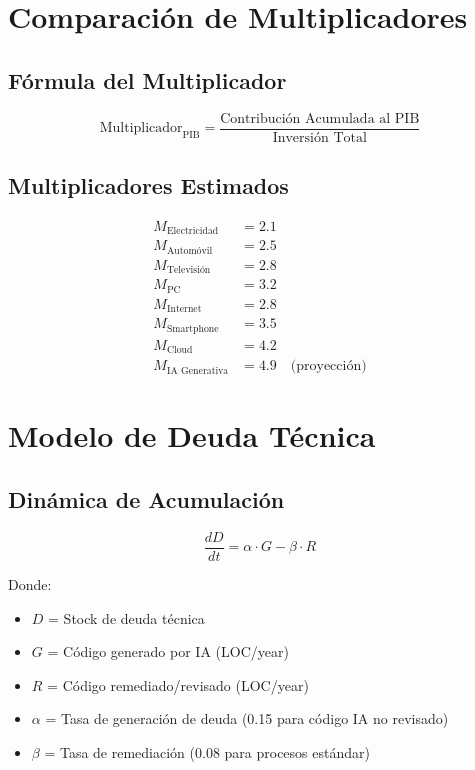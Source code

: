 \documentclass{article}
\begin{document}
\section{Comparación de Multiplicadores}

\subsection{Fórmula del Multiplicador}

\begin{equation}
\text{Multiplicador}_{\text{PIB}} = \frac{\text{Contribución Acumulada al PIB}}{\text{Inversión Total}}
\end{equation}

\subsection{Multiplicadores Estimados}

\begin{align}
M_{\text{Electricidad}} &= 2.1 \\
M_{\text{Automóvil}} &= 2.5 \\
M_{\text{Televisión}} &= 2.8 \\
M_{\text{PC}} &= 3.2 \\
M_{\text{Internet}} &= 2.8 \\
M_{\text{Smartphone}} &= 3.5 \\
M_{\text{Cloud}} &= 4.2 \\
M_{\text{IA Generativa}} &= 4.9 \quad \text{(proyección)}
\end{align}

\section{Modelo de Deuda Técnica}

\subsection{Dinámica de Acumulación}

\begin{equation}
\frac{dD}{dt} = \alpha \cdot G - \beta \cdot R
\end{equation}

Donde:
\begin{itemize}
    \item $D$ = Stock de deuda técnica
    \item $G$ = Código generado por IA (LOC/year)
    \item $R$ = Código remediado/revisado (LOC/year)
    \item $\alpha$ = Tasa de generación de deuda (0.15 para código IA no revisado)
    \item $\beta$ = Tasa de remediación (0.08 para procesos estándar)
\end{itemize}
\end{document}
